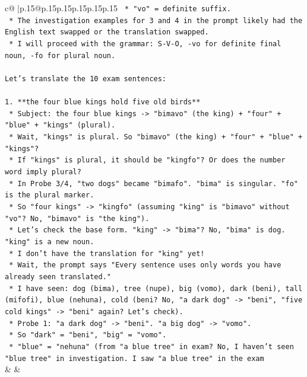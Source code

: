 \documentclass{article}
\begin{document}
{\begin{supertabular}{c@{$\;$}|p{.15\linewidth}@{}p{.15\linewidth}p{.15\linewidth}p{.15\linewidth}p{.15\linewidth}p{.15\linewidth}}
{{{\texttt{                                        *   "vo" = definite suffix.} \\
\texttt{                                        *   The investigation examples for 3 and 4 in the prompt likely had the English text swapped or the translation swapped.} \\
\texttt{                                        *   I will proceed with the grammar: S{-}V{-}O, {-}vo for definite final noun, {-}fo for plural noun.} \\
\\ 
\texttt{Let's translate the 10 exam sentences:} \\
\\ 
\texttt{1.  **the four blue kings hold five old birds**} \\
\texttt{    *   Subject: the four blue kings {-}> "bimavo" (the king) + "four" + "blue" + "kings" (plural).} \\
\texttt{        *   Wait, "kings" is plural. So "bimavo" (the king) + "four" + "blue" + "kings"?} \\
\texttt{        *   If "kings" is plural, it should be "kingfo"? Or does the number word imply plural?} \\
\texttt{        *   In Probe 3/4, "two dogs" became "bimafo". "bima" is singular. "fo" is the plural marker.} \\
\texttt{        *   So "four kings" {-}> "kingfo" (assuming "king" is "bimavo" without "vo"? No, "bimavo" is "the king").} \\
\texttt{        *   Let's check the base form. "king" {-}> "bima"? No, "bima" is dog. "king" is a new noun.} \\
\texttt{        *   I don't have the translation for "king" yet!} \\
\texttt{        *   Wait, the prompt says "Every sentence uses only words you have already seen translated."} \\
\texttt{        *   I have seen: dog (bima), tree (nupe), big (vomo), dark (beni), tall (mifofi), blue (nehuna), cold (beni? No, "a dark dog" {-}> "beni", "five cold kings" {-}> "beni" again? Let's check).} \\
\texttt{        *   Probe 1: "a dark dog" {-}> "beni". "a big dog" {-}> "vomo".} \\
\texttt{        *   So "dark" = "beni", "big" = "vomo".} \\
\texttt{        *   "blue" = "nehuna" (from "a blue tree" in exam? No, I haven't seen "blue tree" in investigation. I saw "a blue tree" in the exam} \\
            }
        }
    }
    & & \\ \\


\end{supertabular}}
\end{document}
